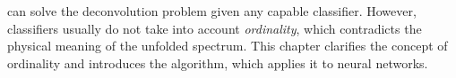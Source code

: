 \dsea{} can solve the deconvolution problem
given any capable classifier.
However,
  classifiers usually do not take into account \emph{ordinality},
which contradicts the physical meaning of the unfolded spectrum.
%
This chapter
  clarifies the concept of ordinality
  and
  introduces the \corn{} algorithm,
    which applies it to neural networks.
